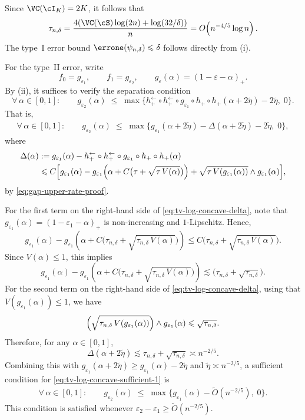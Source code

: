 \documentclass[english]{article}
\theoremstyle{plain}
\theoremstyle{definition}
\newcommand{\hupup}{h_+\mathbin{\circ}h_+}                 %
\newcommand{\hinvinv}{h_+^{\leftarrow}\mathbin{\circ}h_+^{\leftarrow}}  %
\newcommand{\mgn}[1]{\tau+\sqrt{\tau\,V(#1)}}
\newcommand{\fnull}{f_0}
\newcommand{\falt}{f_1}
\newcommand{\tauND}{\tau_{n,\delta}}               %
\begin{document}
\noindent Since \(\VC(\cI_K)=2K\), it follows that
\[
\tauND
=
\frac{4(\VC(\cS)\log(2n)+\log(32/\delta))}{n}
=
O\!\left(n^{-4/5}\log n\right).
\]
The type~I error bound \(\errone(\psi_{n,\delta})\leqslant \delta\) follows directly from (i).

\noindent For the type~II error, write
\[
\fnull=g_{\varepsilon_1},
\qquad
\falt=g_{\varepsilon_2},
\qquad
g_\varepsilon(\alpha)=(1-\varepsilon-\alpha)_+.
\]
By (ii), it suffices to verify the separation condition
\[
\forall\, \alpha \in [0,1]:\qquad g_{\varepsilon_2}(\alpha) \;\leqslant\; \max\big\{\hinvinv\circ g_{\varepsilon_1}\circ \hupup(\alpha + 2\widetilde{\eta})-2\widetilde{\eta},\;0\big\}.
\]
That is,
\begin{align}\label{eq:tv-log-concave-sufficient-1}
    \forall\, \alpha \in [0,1]:\qquad g_{\varepsilon_2}(\alpha) \;\leqslant\; \max\big\{g_{\varepsilon_1}(\alpha+2\widetilde{\eta})-\Delta(\alpha+2\widetilde{\eta})-2\widetilde{\eta},\;0\big\},
\end{align}
where
\begin{align}\label{eq:tv-log-concave-delta}
\Delta(\alpha)&:=g_{\varepsilon_1}(\alpha)-\hinvinv\circ g_{\varepsilon_1}\circ \hupup(\alpha)\nonumber\\
&\leqslant
C \Bigl[
g_{\varepsilon_1}(\alpha) - g_{\varepsilon_1}\!\left(\alpha + C \bigl(\mgn{\alpha}\bigr)\right)
+ \sqrt{\tau\,V(g_{\varepsilon_1}(\alpha))} \wedge g_{\varepsilon_1}(\alpha)
\Bigr],
\end{align}
by \eqref{eq:gap-upper-rate-proof}.

\noindent For the first term on the right-hand side of \eqref{eq:tv-log-concave-delta}, note that \(g_{\varepsilon_1}(\alpha)=(1-\varepsilon_1-\alpha)_+\) is non-increasing and \(1\)-Lipschitz. Hence,
\[
g_{\varepsilon_1}(\alpha)-g_{\varepsilon_1}\!\left(\alpha+C\bigl(\tauND+\sqrt{\tauND\,V(\alpha)}\bigr)\right)
\leqslant
C\bigl(\tauND+\sqrt{\tauND\,V(\alpha)}\bigr).
\]
Since \(V(\alpha)\leqslant 1\), this implies
\[
g_{\varepsilon_1}(\alpha)-g_{\varepsilon_1}\!\left(\alpha+C\bigl(\tauND+\sqrt{\tauND\,V(\alpha)}\bigr)\right)
\lesssim
\bigl(\tauND+\sqrt{\tauND}\bigr).
\]
For the second term on the right-hand side of \eqref{eq:tv-log-concave-delta}, using that \(V(g_{\varepsilon_1}(\alpha))\leqslant 1\), we have
\[
\Bigl(\sqrt{\tauND\,V(g_{\varepsilon_1}(\alpha))}\Bigr)\wedge g_{\varepsilon_1}(\alpha)
\leqslant
\sqrt{\tauND}.
\]
Therefore, for any \(\alpha\in [0,1]\),
\[
\Delta(\alpha+2\widetilde{\eta})\lesssim \tauND+\sqrt{\tauND} \asymp n^{-2/5}.
\]
Combining this with \(g_{\varepsilon_1}(\alpha+2\widetilde{\eta})\geqslant g_{\varepsilon_1}(\alpha)-2\widetilde{\eta}\) and \(\widetilde{\eta}\asymp n^{-2/5}\), a sufficient condition for \eqref{eq:tv-log-concave-sufficient-1} is
\begin{align*}
    \forall\, \alpha \in [0,1]:\qquad g_{\varepsilon_2}(\alpha) \;\leqslant\; \max\big\{g_{\varepsilon_1}(\alpha)-\widetilde{O}(n^{-2/5}),\;0\big\}.
\end{align*}
This condition is satisfied whenever \(\varepsilon_2-\varepsilon_1\geqslant \widetilde{O}(n^{-2/5})\).
\end{document}
